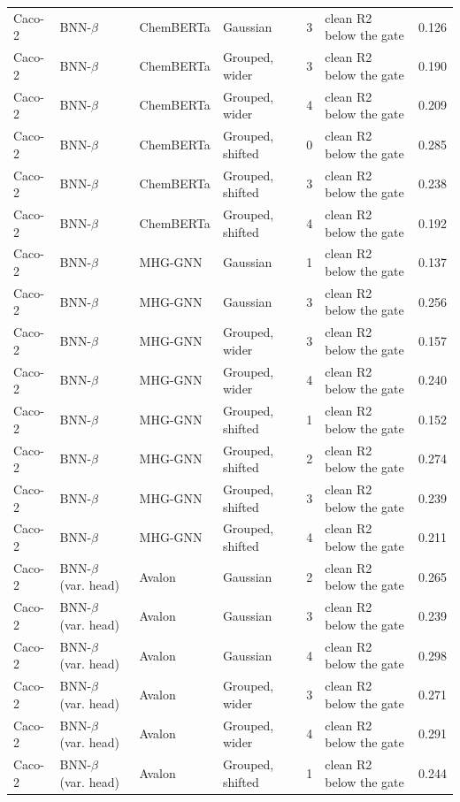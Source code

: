 {\begin{longtable}{llllcll}
Caco-2 & BNN-$\beta$ & ChemBERTa & Gaussian & 3 & clean R2 below the gate & 0.126 \\
Caco-2 & BNN-$\beta$ & ChemBERTa & Grouped, wider & 3 & clean R2 below the gate & 0.190 \\
Caco-2 & BNN-$\beta$ & ChemBERTa & Grouped, wider & 4 & clean R2 below the gate & 0.209 \\
Caco-2 & BNN-$\beta$ & ChemBERTa & Grouped, shifted & 0 & clean R2 below the gate & 0.285 \\
Caco-2 & BNN-$\beta$ & ChemBERTa & Grouped, shifted & 3 & clean R2 below the gate & 0.238 \\
Caco-2 & BNN-$\beta$ & ChemBERTa & Grouped, shifted & 4 & clean R2 below the gate & 0.192 \\
Caco-2 & BNN-$\beta$ & MHG-GNN & Gaussian & 1 & clean R2 below the gate & 0.137 \\
Caco-2 & BNN-$\beta$ & MHG-GNN & Gaussian & 3 & clean R2 below the gate & 0.256 \\
Caco-2 & BNN-$\beta$ & MHG-GNN & Grouped, wider & 3 & clean R2 below the gate & 0.157 \\
Caco-2 & BNN-$\beta$ & MHG-GNN & Grouped, wider & 4 & clean R2 below the gate & 0.240 \\
Caco-2 & BNN-$\beta$ & MHG-GNN & Grouped, shifted & 1 & clean R2 below the gate & 0.152 \\
Caco-2 & BNN-$\beta$ & MHG-GNN & Grouped, shifted & 2 & clean R2 below the gate & 0.274 \\
Caco-2 & BNN-$\beta$ & MHG-GNN & Grouped, shifted & 3 & clean R2 below the gate & 0.239 \\
Caco-2 & BNN-$\beta$ & MHG-GNN & Grouped, shifted & 4 & clean R2 below the gate & 0.211 \\
Caco-2 & BNN-$\beta$ (var. head) & Avalon & Gaussian & 2 & clean R2 below the gate & 0.265 \\
Caco-2 & BNN-$\beta$ (var. head) & Avalon & Gaussian & 3 & clean R2 below the gate & 0.239 \\
Caco-2 & BNN-$\beta$ (var. head) & Avalon & Gaussian & 4 & clean R2 below the gate & 0.298 \\
Caco-2 & BNN-$\beta$ (var. head) & Avalon & Grouped, wider & 3 & clean R2 below the gate & 0.271 \\
Caco-2 & BNN-$\beta$ (var. head) & Avalon & Grouped, wider & 4 & clean R2 below the gate & 0.291 \\
Caco-2 & BNN-$\beta$ (var. head) & Avalon & Grouped, shifted & 1 & clean R2 below the gate & 0.244 \\

\end{longtable}}
